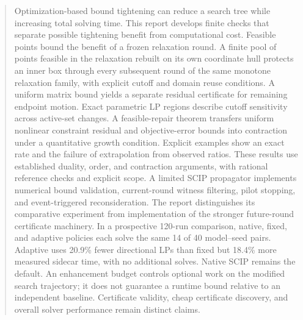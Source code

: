 \begin{abstract}
Optimization-based bound tightening can reduce a search tree while
increasing total solving time. This report develops finite checks that
separate possible tightening benefit from computational cost. Feasible
points bound the benefit of a frozen relaxation round. A finite pool of
points feasible in the relaxation rebuilt on its own coordinate hull
protects an inner box through every subsequent round of the same monotone
relaxation family, with explicit cutoff and domain reuse conditions.
A uniform matrix bound yields a separate residual certificate for
remaining endpoint motion. Exact parametric LP regions describe cutoff
sensitivity across active-set changes. A feasible-repair theorem transfers
uniform nonlinear constraint residual and objective-error bounds into
contraction under a quantitative growth condition. Explicit examples show
an exact rate and the failure of extrapolation from observed ratios.
These results use established duality, order, and contraction
arguments, with rational reference checks and explicit scope. A limited
SCIP propagator implements numerical bound validation, current-round
witness filtering, pilot stopping, and event-triggered reconsideration.
The report distinguishes its comparative experiment from implementation
of the stronger future-round certificate machinery. In a prospective
120-run comparison, native, fixed, and adaptive policies each solve the
same 14 of 40 model--seed pairs. Adaptive uses 20.9\% fewer directional
LPs than fixed but 18.4\% more measured sidecar time, with no additional
solves. Native SCIP remains the default. An enhancement
budget controls optional work on the modified search trajectory; it does
not guarantee a runtime bound relative to an independent baseline.
Certificate validity, cheap certificate discovery, and overall solver
performance remain distinct claims.
\end{abstract}
